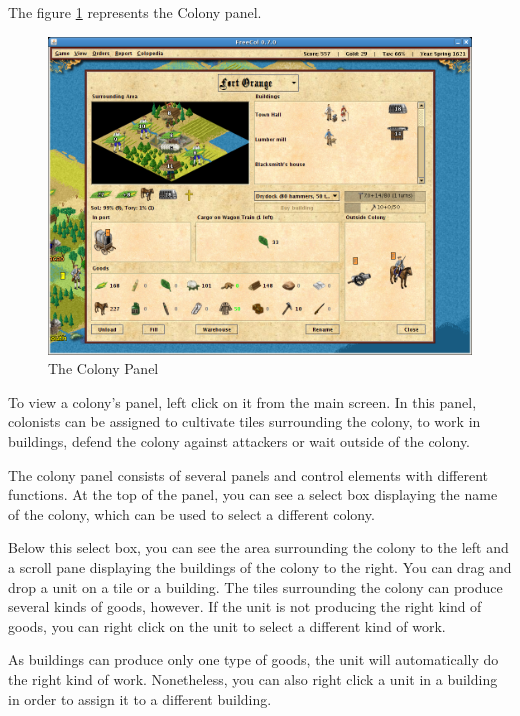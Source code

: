 \documentclass[12pt]{article}
\begin{document}
The figure \ref{colony_panel_fig} represents the Colony panel.
\begin{figure}[htb]
  \begin{center}
    \includegraphics[scale=0.35]{images/colony_panel.png}
    \caption{The Colony Panel\label{colony_panel_fig}}
  \end{center}
\end{figure}

To view a colony's panel, left click on it from the main screen. In
this panel, colonists can be assigned to cultivate tiles surrounding
the colony, to work in buildings, defend the colony against attackers
or wait outside of the colony.

The colony panel consists of several panels and control elements with
different functions. At the top of the panel, you can see a select box
displaying the name of the colony, which can be used to select a
different colony.

Below this select box, you can see the area surrounding the colony to
the left and a scroll pane displaying the buildings of the colony to
the right. You can drag and drop a unit on a tile or a building. The
tiles surrounding the colony can produce several kinds of goods,
however. If the unit is not producing the right kind of goods, you can
right click on the unit to select a different kind of work.

As buildings can produce only one type of goods, the unit will
automatically do the right kind of work. Nonetheless, you can also
right click a unit in a building in order to assign it to a different
building.
\end{document}
